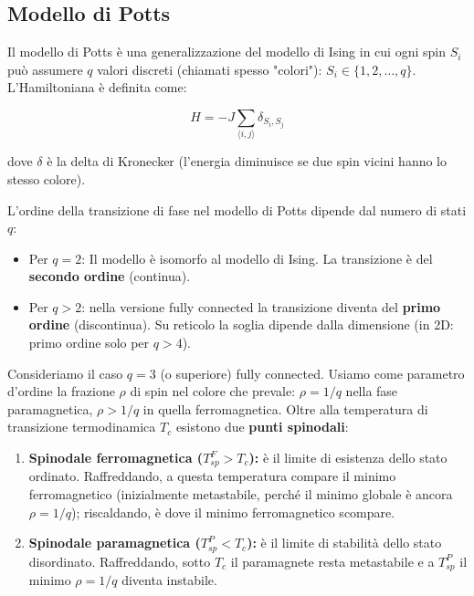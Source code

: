 \subsection{Modello di Potts}

Il modello di Potts è una generalizzazione del modello di Ising in cui ogni spin $S_i$ può assumere $q$ valori discreti (chiamati spesso "colori"): $S_i \in \{1, 2, \dots, q\}$.
L'Hamiltoniana è definita come:

\begin{equation}
    H = -J \sum_{\langle i,j \rangle} \delta_{S_i, S_j}
\end{equation}

dove $\delta$ è la delta di Kronecker (l'energia diminuisce se due spin vicini hanno lo stesso colore).


L'ordine della transizione di fase nel modello di Potts dipende dal numero di stati $q$:
\begin{itemize}
    \item Per $q=2$: Il modello è isomorfo al modello di Ising. La transizione è del \textbf{secondo ordine} (continua).
    \item Per $q > 2$: nella versione fully connected la transizione diventa del \textbf{primo ordine} (discontinua). Su reticolo la soglia dipende dalla dimensione (in 2D: primo ordine solo per $q>4$).
\end{itemize}

\noindent Consideriamo il caso $q=3$ (o superiore) fully connected. Usiamo come parametro d'ordine la frazione $\rho$ di spin nel colore che prevale: $\rho = 1/q$ nella fase paramagnetica, $\rho > 1/q$ in quella ferromagnetica. Oltre alla temperatura di transizione termodinamica $T_c$ esistono due \textbf{punti spinodali}:

\begin{enumerate}
    \item \textbf{Spinodale ferromagnetica ($T_{sp}^{F} > T_c$):} è il limite di esistenza dello stato ordinato. Raffreddando, a questa temperatura compare il minimo ferromagnetico (inizialmente metastabile, perché il minimo globale è ancora $\rho = 1/q$); riscaldando, è dove il minimo ferromagnetico scompare.
    \item \textbf{Spinodale paramagnetica ($T_{sp}^{P} < T_c$):} è il limite di stabilità dello stato disordinato. Raffreddando, sotto $T_c$ il paramagnete resta metastabile e a $T_{sp}^{P}$ il minimo $\rho = 1/q$ diventa instabile.
\end{enumerate}

